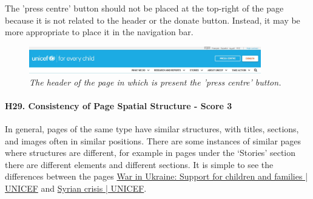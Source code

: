 \newline The 'press centre' button should not be placed at the top-right of the page because it is not related to the header or the donate button. Instead, it may be more appropriate to place it in the navigation bar.
\begin{figure}[h]
	\begin{center}
		\includegraphics[width=0.9\textwidth]{FinalScores32.jpg}
		\captionsetup{font=small}
		\caption{\textit{The header of the page in which is present the 'press centre' button.}}
	\end{center}
\end{figure}
\newline
\newline \paragraph{H29. Consistency of Page Spatial Structure - Score 3} \label{subsec:H29}	In general, pages of the same type have similar structures, with titles, sections, and images often in similar positions. There are some instances of similar pages where structures are different, for example in pages under the ‘Stories’ section there are different elements and different sections.
\newline It is simple to see the differences between the pages \href{https://www.unicef.org/emergencies/war-ukraine-pose-immediate-threat-children}{War in Ukraine: Support for children and families | UNICEF} and \href{https://www.unicef.org/emergencies/syrian-crisis}{Syrian crisis | UNICEF}.




















